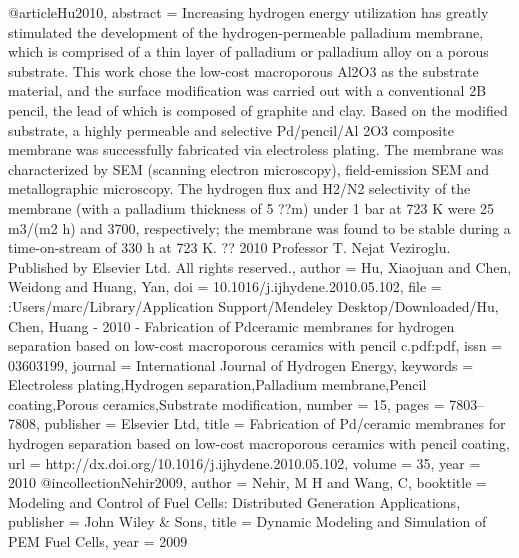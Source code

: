 @article{Hu2010,
abstract = {Increasing hydrogen energy utilization has greatly stimulated the development of the hydrogen-permeable palladium membrane, which is comprised of a thin layer of palladium or palladium alloy on a porous substrate. This work chose the low-cost macroporous Al2O3 as the substrate material, and the surface modification was carried out with a conventional 2B pencil, the lead of which is composed of graphite and clay. Based on the modified substrate, a highly permeable and selective Pd/pencil/Al 2O3 composite membrane was successfully fabricated via electroless plating. The membrane was characterized by SEM (scanning electron microscopy), field-emission SEM and metallographic microscopy. The hydrogen flux and H2/N2 selectivity of the membrane (with a palladium thickness of 5 ??m) under 1 bar at 723 K were 25 m3/(m2 h) and 3700, respectively; the membrane was found to be stable during a time-on-stream of 330 h at 723 K. ?? 2010 Professor T. Nejat Veziroglu. Published by Elsevier Ltd. All rights reserved.},
author = {Hu, Xiaojuan and Chen, Weidong and Huang, Yan},
doi = {10.1016/j.ijhydene.2010.05.102},
file = {:Users/marc/Library/Application Support/Mendeley Desktop/Downloaded/Hu, Chen, Huang - 2010 - Fabrication of Pdceramic membranes for hydrogen separation based on low-cost macroporous ceramics with pencil c.pdf:pdf},
issn = {03603199},
journal = {International Journal of Hydrogen Energy},
keywords = {Electroless plating,Hydrogen separation,Palladium membrane,Pencil coating,Porous ceramics,Substrate modification},
number = {15},
pages = {7803--7808},
publisher = {Elsevier Ltd},
title = {{Fabrication of Pd/ceramic membranes for hydrogen separation based on low-cost macroporous ceramics with pencil coating}},
url = {http://dx.doi.org/10.1016/j.ijhydene.2010.05.102},
volume = {35},
year = {2010}
}
@incollection{Nehir2009,
author = {Nehir, M H and Wang, C},
booktitle = {Modeling and Control of Fuel Cells: Distributed Generation Applications},
publisher = {John Wiley {\&} Sons},
title = {{Dynamic Modeling and Simulation of PEM Fuel Cells}},
year = {2009}
}
